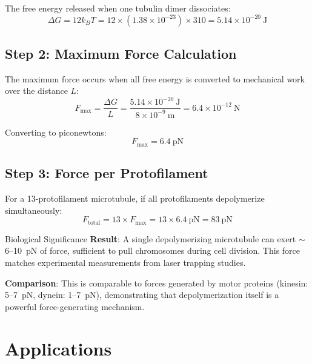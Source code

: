 The free energy released when one tubulin dimer dissociates:
\begin{equation}
\Delta G = 12 k_B T = 12 \times (1.38 \times 10^{-23}) \times 310 = 5.14 \times 10^{-20}~\text{J}
\label{eq:delta-g}
\end{equation}

\subsection*{Step 2: Maximum Force Calculation}

The maximum force occurs when all free energy is converted to mechanical work over the distance $L$:
\begin{equation}
F_{\text{max}} = \frac{\Delta G}{L} = \frac{5.14 \times 10^{-20}~\text{J}}{8 \times 10^{-9}~\text{m}} = 6.4 \times 10^{-12}~\text{N}
\label{eq:force-max}
\end{equation}

Converting to piconewtons:
\begin{equation}
F_{\text{max}} = 6.4~\text{pN}
\label{eq:force-pn}
\end{equation}

\subsection*{Step 3: Force per Protofilament}

For a 13-protofilament microtubule, if all protofilaments depolymerize simultaneously:
\begin{equation}
F_{\text{total}} = 13 \times F_{\text{max}} = 13 \times 6.4~\text{pN} = 83~\text{pN}
\label{eq:total-force}
\end{equation}

\begin{calloutbox}{Biological Significance}
\textbf{Result}: A single depolymerizing microtubule can exert $\sim$6--10~pN of force, sufficient to pull chromosomes during cell division. This force matches experimental measurements from laser trapping studies.

\textbf{Comparison}: This is comparable to forces generated by motor proteins (kinesin: 5--7~pN, dynein: 1--7~pN), demonstrating that depolymerization itself is a powerful force-generating mechanism.
\end{calloutbox}

\section{Applications}
\label{sec:applications}

